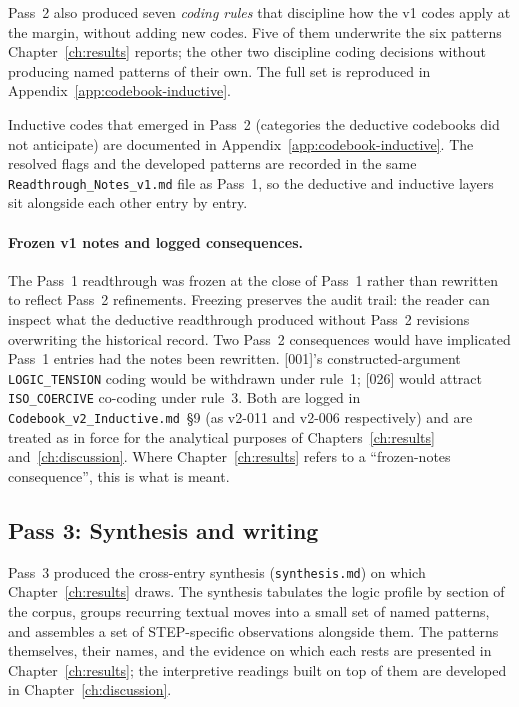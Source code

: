 Pass~2 also produced seven \emph{coding rules} that discipline how the
v1 codes apply at the margin, without adding new codes. Five of them
underwrite the six patterns Chapter~\ref{ch:results} reports; the
other two discipline coding decisions without producing named patterns
of their own. The full set is reproduced in
Appendix~\ref{app:codebook-inductive}.

Inductive codes that emerged in Pass~2 (categories the deductive
codebooks did not anticipate) are documented in
Appendix~\ref{app:codebook-inductive}. The resolved flags and the
developed patterns are recorded in the same
\texttt{Readthrough\_Notes\_v1.md} file as Pass~1, so the deductive and
inductive layers sit alongside each other entry by entry.

\paragraph{Frozen v1 notes and logged consequences.}
The Pass~1 readthrough was frozen at the close of Pass~1 rather than
rewritten to reflect Pass~2 refinements. Freezing preserves the audit
trail: the reader can inspect what the deductive readthrough produced
without Pass~2 revisions overwriting the historical record. Two Pass~2
consequences would have implicated Pass~1 entries had the notes been
rewritten. [001]'s constructed-argument \texttt{LOGIC\_TENSION} coding
would be withdrawn under rule~1; [026] would attract
\texttt{ISO\_COERCIVE} co-coding under rule~3. Both are logged in
\texttt{Codebook\_v2\_Inductive.md}~\S9 (as v2-011 and v2-006
respectively) and are treated as in force for the analytical purposes
of Chapters~\ref{ch:results} and~\ref{ch:discussion}. Where
Chapter~\ref{ch:results} refers to a \enquote{frozen-notes
consequence}, this is what is meant.

\subsection{Pass 3: Synthesis and writing}
\label{sec:meth-pass3}

Pass~3 produced the cross-entry synthesis (\texttt{synthesis.md}) on
which Chapter~\ref{ch:results} draws. The synthesis tabulates the
logic profile by section of the corpus, groups recurring textual
moves into a small set of named patterns, and assembles a set of
STEP-specific observations alongside them. The patterns themselves,
their names, and the evidence on which each rests are presented in
Chapter~\ref{ch:results}; the interpretive readings built on top of
them are developed in Chapter~\ref{ch:discussion}.

